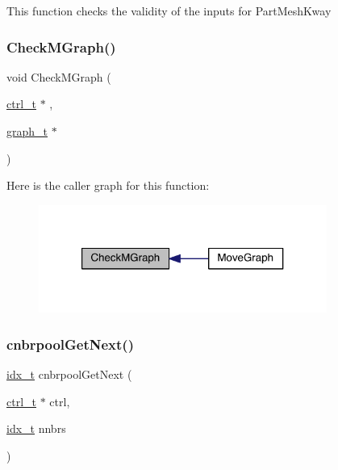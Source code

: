 This function checks the validity of the inputs for Part\+Mesh\+Kway \mbox{\label{a00951_a05146129f4c1de43387352ef9c8a2056}} 
\subsubsection{\texorpdfstring{Check\+M\+Graph()}{CheckMGraph()}}
{\footnotesize\ttfamily void Check\+M\+Graph (\begin{DoxyParamCaption}\item[{\hyperlink{a00742}{ctrl\+\_\+t} $\ast$}]{,  }\item[{\hyperlink{a00734}{graph\+\_\+t} $\ast$}]{ }\end{DoxyParamCaption})}

Here is the caller graph for this function\+:\nopagebreak
\begin{figure}[H]
\begin{center}
\leavevmode
\includegraphics[width=268pt]{a00951_a05146129f4c1de43387352ef9c8a2056_icgraph}
\end{center}
\end{figure}
\mbox{\label{a00951_a5c7982f300512c943ce53a0531529ae8}} 
\subsubsection{\texorpdfstring{cnbrpool\+Get\+Next()}{cnbrpoolGetNext()}}
{\footnotesize\ttfamily \hyperlink{a00876_aaa5262be3e700770163401acb0150f52}{idx\+\_\+t} cnbrpool\+Get\+Next (\begin{DoxyParamCaption}\item[{\hyperlink{a00742}{ctrl\+\_\+t} $\ast$}]{ctrl,  }\item[{\hyperlink{a00876_aaa5262be3e700770163401acb0150f52}{idx\+\_\+t}}]{nnbrs }\end{DoxyParamCaption})}

